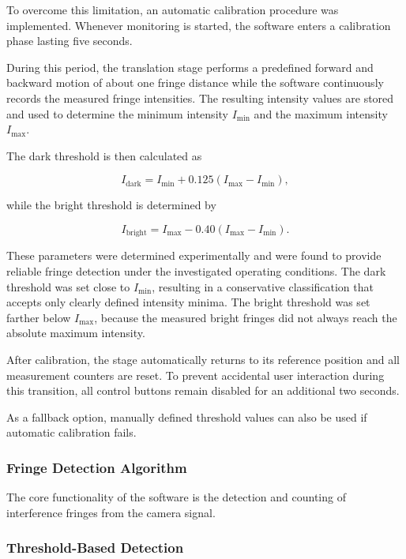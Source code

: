 To overcome this limitation, an automatic calibration procedure was implemented. Whenever monitoring is started, the software enters a calibration phase lasting five seconds.

During this period, the translation stage performs a predefined forward and backward motion of about one fringe distance while the software continuously records the measured fringe intensities. The resulting intensity values are stored and used to determine the minimum intensity \(I_{\min}\) and the maximum intensity \(I_{\max}\).

The dark threshold is then calculated as

\begin{equation}
I_{\mathrm{dark}}
=
I_{\min}
+
0.125
\left(
I_{\max}-I_{\min}
\right),
\end{equation}

while the bright threshold is determined by

\begin{equation}
I_{\mathrm{bright}}
=
I_{\max}
-
0.40
\left(
I_{\max}-I_{\min}
\right).
\end{equation}

These parameters were determined experimentally and were found to provide reliable fringe detection under the investigated operating conditions. The dark threshold was set close to \(I_{\min}\), resulting in a conservative classification that accepts only clearly defined intensity minima. The bright threshold was set farther below \(I_{\max}\), because the measured bright fringes did not always reach the absolute maximum intensity. 

After calibration, the stage automatically returns to its reference position and all measurement counters are reset. To prevent accidental user interaction during this transition, all control buttons remain disabled for an additional two seconds.

As a fallback option, manually defined threshold values can also be used if automatic calibration fails.

\subsubsection{Fringe Detection Algorithm}

The core functionality of the software is the detection and counting of interference fringes from the camera signal.

\subsubsection{Threshold-Based Detection}

